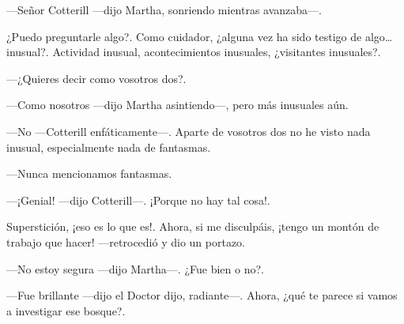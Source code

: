 ---Señor Cotterill ---dijo Martha, sonriendo mientras avanzaba---.

¿Puedo preguntarle algo?. Como cuidador, ¿alguna vez ha sido testigo de algo\ldots{} inusual?. Actividad inusual, acontecimientos inusuales, ¿visitantes inusuales?.

---¿Quieres decir como vosotros dos?.

---Como nosotros ---dijo Martha asintiendo---, pero más inusuales aún.

---No ---Cotterill enfáticamente---. Aparte de vosotros dos no he visto nada inusual, especialmente nada de fantasmas.

---Nunca mencionamos fantasmas.

---¡Genial! ---dijo Cotterill---. ¡Porque no hay tal cosa!.

Superstición, ¡eso es lo que es!. Ahora, si me disculpáis, ¡tengo un montón de trabajo que hacer! ---retrocedió y dio un portazo.

---No estoy segura ---dijo Martha---. ¿Fue bien o no?.

---Fue brillante ---dijo el Doctor dijo, radiante---. Ahora, ¿qué te parece si vamos a investigar ese bosque?.

